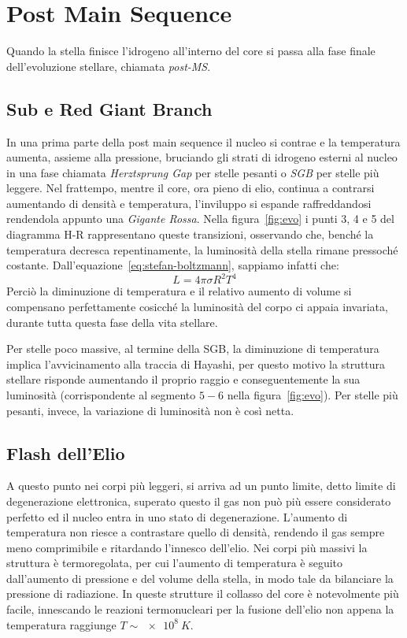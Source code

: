 \section{Post Main Sequence}\label{sec:post-main-sequence}
Quando la stella finisce l'idrogeno all'interno del core si passa alla fase finale dell'evoluzione stellare, chiamata \textit{post-MS}. 

\subsection{Sub e Red Giant Branch}\label{sec:SGB-RGB}
In una prima parte della post main sequence il nucleo si contrae e la temperatura aumenta, assieme alla pressione, bruciando gli strati di idrogeno esterni al nucleo in una fase chiamata \textit{Herztsprung Gap} per stelle pesanti o \textit{SGB} per stelle più leggere. Nel frattempo, mentre il core, ora pieno di elio, continua a contrarsi aumentando di densità e temperatura, l'inviluppo si espande raffreddandosi rendendola appunto una \textit{Gigante Rossa}. Nella figura~\ref{fig:evo} i punti 3, 4 e 5 del diagramma H-R rappresentano queste transizioni, osservando che, benché la temperatura decresca repentinamente, la luminosità della stella rimane pressoché costante. Dall'equazione~\eqref{eq:stefan-boltzmann}, sappiamo infatti che:
\[
    L = 4\pi \sigma R^2 T^4
\]
Perciò la diminuzione di temperatura e il relativo aumento di volume si compensano perfettamente cosicché la luminosità del corpo ci appaia invariata, durante tutta questa fase della vita stellare.

Per stelle poco massive, al termine della SGB, la diminuzione di temperatura implica l'avvicinamento alla traccia di Hayashi, per questo motivo la struttura stellare risponde aumentando il proprio raggio e conseguentemente la sua luminosità (corrispondente al segmento $5-6$ nella figura~\ref{fig:evo}). Per stelle più pesanti, invece, la variazione di luminosità non è così netta. 
\subsection{Flash dell'Elio}\label{sec:flash-He e Horizontal Branch}

A questo punto nei corpi più leggeri, si arriva ad un punto limite, detto limite di degenerazione elettronica, superato questo il gas non può più essere considerato perfetto ed il nucleo entra in uno stato di degenerazione. L'aumento di temperatura non riesce a contrastare quello di densità, rendendo il gas sempre meno comprimibile e ritardando l'innesco dell'elio. Nei corpi più massivi la struttura è termoregolata, per cui l'aumento di temperatura è seguito dall'aumento di pressione e del volume della stella, in modo tale da bilanciare la pressione di radiazione. In queste strutture il collasso del core è notevolmente più facile, innescando le reazioni termonucleari per la fusione dell'elio non appena la temperatura raggiunge $T \sim \SI{e8}{K}$.

